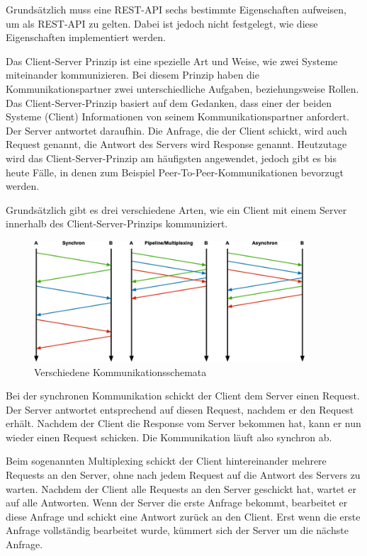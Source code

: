 
Grundsätzlich muss eine REST-API sechs bestimmte Eigenschaften aufweisen, um als REST-API zu gelten. Dabei ist jedoch nicht festgelegt, wie diese Eigenschaften implementiert werden. \cite{RedHatRest}


Das Client-Server Prinzip ist eine spezielle Art und Weise, wie zwei Systeme miteinander kommunizieren. Bei diesem Prinzip haben die Kommunikationspartner zwei unterschiedliche Aufgaben, beziehungsweise Rollen. Das Client-Server-Prinzip basiert auf dem Gedanken, dass einer der beiden Systeme (Client) Informationen von seinem Kommunikationspartner anfordert. Der Server antwortet daraufhin. Die Anfrage, die der Client schickt, wird auch Request genannt, die Antwort des Servers wird Response genannt. Heutzutage wird das Client-Server-Prinzip am häufigsten angewendet, jedoch gibt es bis heute Fälle, in denen zum Beispiel Peer-To-Peer-Kommunikationen bevorzugt werden.

Grundsätzlich gibt es drei verschiedene Arten, wie ein Client mit einem Server innerhalb des Client-Server-Prinzips kommuniziert. 

\begin{figure}[H]
    \centering
    \includegraphics[width=0.9\textwidth]{media/REST/ClientServer.png}
    \caption{Verschiedene Kommunikationsschemata \cite{ClientServer}}
\end{figure}

Bei der synchronen Kommunikation schickt der Client dem Server einen Request. Der Server antwortet entsprechend auf diesen Request, nachdem er den Request erhält. Nachdem der Client die Response vom Server bekommen hat, kann er nun wieder einen Request schicken. Die Kommunikation läuft also synchron ab.

Beim sogenannten Multiplexing schickt der Client hintereinander mehrere Requests an den Server, ohne nach jedem Request auf die Antwort des Servers zu warten. Nachdem der Client alle Requests an den Server geschickt hat, wartet er auf alle Antworten. Wenn der Server die erste Anfrage bekommt, bearbeitet er diese Anfrage und schickt eine Antwort zurück an den Client. Erst wenn die erste Anfrage vollständig bearbeitet wurde, kümmert sich der Server um die nächste Anfrage.

